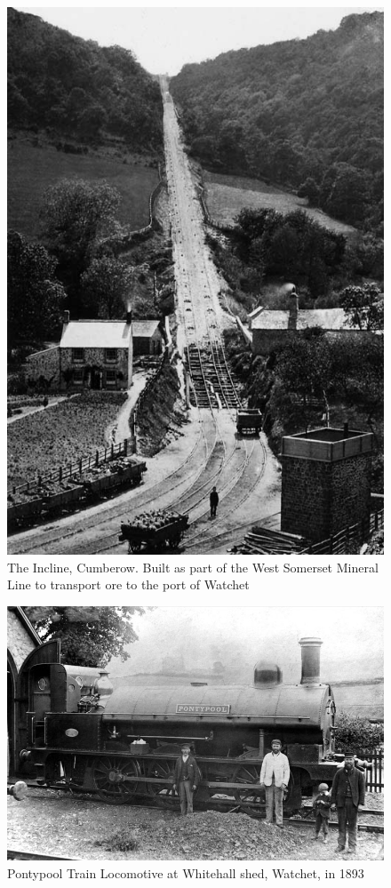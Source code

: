 \begin{figure}
	 \centering
     \includegraphics[width=1\textwidth]{figures/comberowIncline}
     \caption{The Incline, Cumberow. Built as part of the West Somerset Mineral Line to transport ore to the port of Watchet}
     \label{fig:Comberow}
\end{figure}

\begin{figure}
	 \centering
     \includegraphics[width=1\textwidth]{figures/pontypoolWatchet}
     \caption{Pontypool Train Locomotive at Whitehall shed, Watchet, in 1893}
     \label{fig:Pontypool}
\end{figure}

